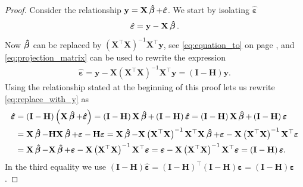 \begin{proof}
    Consider the relationship $\mathbf{y} = \mathbf{X}\operatorname{\boldsymbol{\hat{\beta}}} + \boldsymbol{\hat{\varepsilon}}$.
    We start by isolating $\boldsymbol{\hat{\varepsilon}}$
    \begin{align*}
        \boldsymbol{\hat{\varepsilon}} = \mathbf{y} - \mathbf{X}\operatorname{\boldsymbol{\hat{\beta}}}.
    \end{align*}
    Now $\operatorname{\boldsymbol{\hat{\beta}}}$ can be replaced by $\left(\mathbf{X}^\top\mathbf{X}\right)^{-1}\mathbf{X}^\top\mathbf{y}$, see \eqref{eq:equation_to} on page \pageref{eq:equation_to}, and \eqref{eq:projection_matrix} can be used to rewrite the expression 
    \begin{align}
        \hat{\boldsymbol{\varepsilon}} = \mathbf{y} - \mathbf{X}\left(\mathbf{X}^\top\mathbf{X}\right)^{-1}\mathbf{X}^\top\mathbf{y}
        = \left(\mathbf{I} - \mathbf{H}\right)\mathbf{y}. \label{eq:replace_with_y}
    \end{align}
    Using the relationship stated at the beginning of this proof lets us rewrite \eqref{eq:replace_with_y} as
    \begin{align*}
        \boldsymbol{\hat{\varepsilon}} &= \left(\mathbf{I} - \mathbf{H}\right)\left(\mathbf{X}\operatorname{\boldsymbol{\hat{\beta}}} + \boldsymbol{\hat{\varepsilon}}\right) 
        = \left(\mathbf{I} - \mathbf{H}\right)\mathbf{X}\operatorname{\boldsymbol{\hat{\beta}}} + \left(\mathbf{I} - \mathbf{H}\right)\boldsymbol{\hat{\varepsilon}}
        = \left(\mathbf{I} - \mathbf{H}\right)\mathbf{X}\operatorname{\boldsymbol{\hat{\beta}}} + \left(\mathbf{I} - \mathbf{H}\right)\boldsymbol{\varepsilon}\\
        &= \mathbf{X}\operatorname{\boldsymbol{\hat{\beta}}} - \mathbf{H}\mathbf{X}\operatorname{\boldsymbol{\hat{\beta}}} + \boldsymbol{\varepsilon} - \mathbf{H}\boldsymbol{\varepsilon}
        = \mathbf{X}\operatorname{\boldsymbol{\hat{\beta}}} - \mathbf{X}\left(\mathbf{X}^\top\mathbf{X}\right)^{-1}\mathbf{X}^\top\mathbf{X}\operatorname{\boldsymbol{\hat{\beta}}} + \boldsymbol{\varepsilon} - \mathbf{X}\left(\mathbf{X}^\top\mathbf{X}\right)^{-1}\mathbf{X}^\top\boldsymbol{\varepsilon} \\
        &= \mathbf{X}\operatorname{\boldsymbol{\hat{\beta}}} - \mathbf{X}\operatorname{\boldsymbol{\hat{\beta}}} + \boldsymbol{\varepsilon} - \mathbf{X}\left(\mathbf{X}^\top\mathbf{X}\right)^{-1}\mathbf{X}^\top\boldsymbol{\varepsilon} 
        = \boldsymbol{\varepsilon} - \mathbf{X}\left(\mathbf{X}^\top\mathbf{X}\right)^{-1}\mathbf{X}^\top\boldsymbol{\varepsilon} = \left(\mathbf{I} - \mathbf{H}\right)\boldsymbol{\varepsilon}.
    \end{align*}
    In the third equality we use $(\textbf{I} - \textbf{H})\hat{\boldsymbol{\varepsilon}} = (\textbf{I} - \textbf{H})^\top(\textbf{I} - \textbf{H})\boldsymbol{\varepsilon} = (\textbf{I} - \textbf{H})\boldsymbol{\varepsilon}$.

\end{proof}
